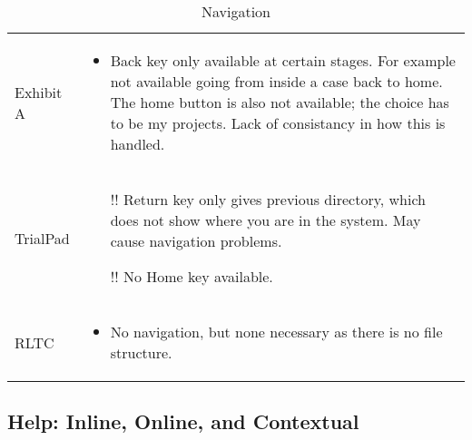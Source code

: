 \begin{center}
\begin{table}[htbp]
\label{tab:Navigation}
  \centering
  \caption{Navigation}
    \begin{tabular}{|p{}|p{}|}
    \hline
    \rowcolor{lightgrey}\multicolumn{2}{c}{Navigation} \\
    \hline
    Exhibit A &
    \begin{itemize}
      \item Back key only available at certain stages. For example not available going from inside a case back to home. The home button is also not available; the choice has to be my projects. Lack of consistancy in how this is handled.
    \end{itemize}\\
    \hline
    TrialPad &
    \begin{itemize}
      \item [\color{amber}!!]\color{black}Return key only gives previous directory, which does not show where you are in the system. May cause navigation problems.
     \item [\color{amber}!!]\color{black}No Home key available.
     
    \end{itemize}\\
    \hline
    RLTC &
    \begin{itemize}
      \item No navigation, but none necessary as there is no file structure. 
         \end{itemize}\\
    \hline
\end{tabular}
\end{table}
\end{center}


\newpage
\subsection{Help: Inline, Online, and Contextual}

